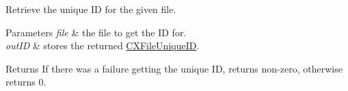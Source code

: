 Retrieve the unique ID for the given {\ttfamily file}. 


\begin{DoxyParams}{Parameters}
{\em file} & the file to get the ID for. \\
\hline
{\em out\+ID} & stores the returned \hyperlink{structCXFileUniqueID}{C\+X\+File\+Unique\+ID}. \\
\hline
\end{DoxyParams}
\begin{DoxyReturn}{Returns}
If there was a failure getting the unique ID, returns non-\/zero, otherwise returns 0. 
\end{DoxyReturn}
